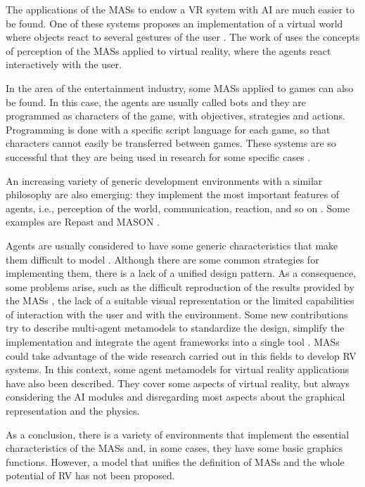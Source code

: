 \documentclass{aamas2012}
\begin{document}
The applications of the MASs to endow a VR system with AI are much easier to be found. One of these systems
proposes an implementation of a virtual world where objects react to several gestures of the user
\cite{Maes1997}. The work of \cite{Wachsmuth1995} uses the concepts of perception of the MASs
applied to virtual reality, where the agents react interactively with the user.

In the area of the entertainment industry, some MASs applied to games can also be found. In this
case, the agents are usually called bots \cite{Khoo2002} and they are programmed as characters of
the game, with objectives, strategies and actions. Programming is done with a specific script
language for each game, so that characters cannot easily be transferred between games. These
systems are so successful that they are being used in research for some specific cases
\cite{Rhyne2000}.

An increasing variety of generic development environments with a similar philosophy are also
emerging: they implement the most important features of agents, i.e., perception of the world,
communication, reaction, and so on \cite{Gilbert2008}. Some examples are Repast \cite{North2005}
and MASON \cite{Luke2004}.

Agents are usually considered to have some generic characteristics that make them difficult to
model \cite{Gilbert2008}. Although there are some common strategies for implementing them, there is
a lack of a unified design pattern. As a consequence, some problems arise, such as the difficult
reproduction of the results provided by the MASs \cite{Axelrod1997}, the lack of a suitable visual
representation or the limited capabilities of interaction with the user and with the environment. Some new contributions try to describe multi-agent metamodels to standardize the design, simplify the implementation and integrate the agent frameworks into a single tool  \cite{Hahn2009}. MASs could take advantage of the wide research carried out in this fields to develop RV systems. In this context, some agent metamodels for virtual reality applications \cite{Querrec2011} have also been described. They cover some aspects of virtual reality, but always considering the AI modules and disregarding most aspects about the graphical representation and the physics.

As a conclusion, there is a variety of environments that implement the essential characteristics
of the MASs and, in some cases, they have some basic graphics functions. However, a model that
unifies the definition of MASs and the whole potential of RV has not been proposed.
\end{document}
